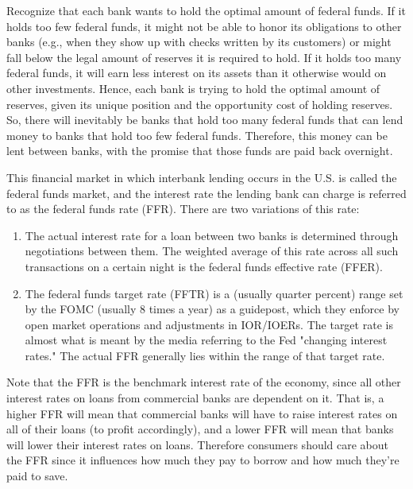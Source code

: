 \documentclass{article}
\begin{document}
    Recognize that each bank wants to hold the optimal amount of federal funds. If it holds too few federal funds, it might not be able to honor its obligations to other banks (e.g., when they show up with checks written by its customers) or might fall below the legal amount of reserves it is required to hold. If it holds too many federal funds, it will earn less interest on its assets than it otherwise would on other investments. Hence, each bank is trying to hold the optimal amount of reserves, given its unique position and the opportunity cost of holding reserves. So, there will inevitably be banks that hold too many federal funds that can lend money to banks that hold too few federal funds. Therefore, this money can be lent between banks, with the promise that those funds are paid back overnight.

    \begin{definition}
      This financial market in which interbank lending occurs in the U.S. is called the federal funds market, and the interest rate the lending bank can charge is referred to as the federal funds rate (FFR). There are two variations of this rate:
      \begin{enumerate}
        \item The actual interest rate for a loan between two banks is determined through negotiations between them. The weighted average of this rate across all such transactions on a certain night is the federal funds effective rate (FFER).
        \item The federal funds target rate (FFTR) is a (usually quarter percent) range set by the FOMC (usually 8 times a year) as a guidepost, which they enforce by open market operations and adjustments in IOR/IOERs. The target rate is almost what is meant by the media referring to the Fed "changing interest rates." The actual FFR generally lies within the range of that target rate.
      \end{enumerate}
    \end{definition}

    Note that the FFR is the benchmark interest rate of the economy, since all other interest rates on loans from commercial banks are dependent on it. That is, a higher FFR will mean that commercial banks will have to raise interest rates on all of their loans (to profit accordingly), and a lower FFR will mean that banks will lower their interest rates on loans. Therefore consumers should care about the FFR since it influences how much they pay to borrow and how much they're paid to save. 
\end{document}
